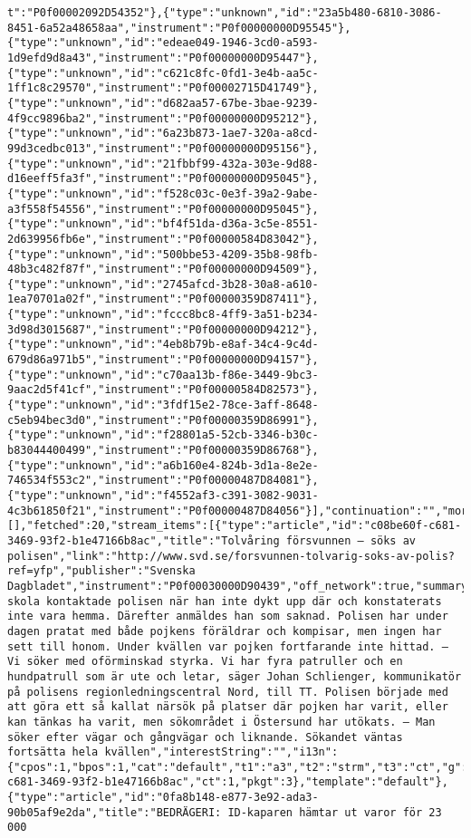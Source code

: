 \begin{verbatim}
t":"P0f00002092D54352"},{"type":"unknown","id":"23a5b480-6810-3086-8451-6a52a48658aa","instrument":"P0f00000000D95545"},{"type":"unknown","id":"edeae049-1946-3cd0-a593-1d9efd9d8a43","instrument":"P0f00000000D95447"},{"type":"unknown","id":"c621c8fc-0fd1-3e4b-aa5c-1ff1c8c29570","instrument":"P0f00002715D41749"},{"type":"unknown","id":"d682aa57-67be-3bae-9239-4f9cc9896ba2","instrument":"P0f00000000D95212"},{"type":"unknown","id":"6a23b873-1ae7-320a-a8cd-99d3cedbc013","instrument":"P0f00000000D95156"},{"type":"unknown","id":"21fbbf99-432a-303e-9d88-d16eeff5fa3f","instrument":"P0f00000000D95045"},{"type":"unknown","id":"f528c03c-0e3f-39a2-9abe-a3f558f54556","instrument":"P0f00000000D95045"},{"type":"unknown","id":"bf4f51da-d36a-3c5e-8551-2d639956fb6e","instrument":"P0f00000584D83042"},{"type":"unknown","id":"500bbe53-4209-35b8-98fb-48b3c482f87f","instrument":"P0f00000000D94509"},{"type":"unknown","id":"2745afcd-3b28-30a8-a610-1ea70701a02f","instrument":"P0f00000359D87411"},{"type":"unknown","id":"fccc8bc8-4ff9-3a51-b234-3d98d3015687","instrument":"P0f00000000D94212"},{"type":"unknown","id":"4eb8b79b-e8af-34c4-9c4d-679d86a971b5","instrument":"P0f00000000D94157"},{"type":"unknown","id":"c70aa13b-f86e-3449-9bc3-9aac2d5f41cf","instrument":"P0f00000584D82573"},{"type":"unknown","id":"3fdf15e2-78ce-3aff-8648-c5eb94bec3d0","instrument":"P0f00000359D86991"},{"type":"unknown","id":"f28801a5-52cb-3346-b30c-b83044400499","instrument":"P0f00000359D86768"},{"type":"unknown","id":"a6b160e4-824b-3d1a-8e2e-746534f553c2","instrument":"P0f00000487D84081"},{"type":"unknown","id":"f4552af3-c391-3082-9031-4c3b61850f21","instrument":"P0f00000487D84056"}],"continuation":"","more":150,"enrichment_ids":[],"fetched":20,"stream_items":[{"type":"article","id":"c08be60f-c681-3469-93f2-b1e47166b8ac","title":"Tolvåring försvunnen – söks av polisen","link":"http://www.svd.se/forsvunnen-tolvarig-soks-av-polis?ref=yfp","publisher":"Svenska Dagbladet","instrument":"P0f00030000D90439","off_network":true,"summary":"Pojkens skola kontaktade polisen när han inte dykt upp där och konstaterats inte vara hemma. Därefter anmäldes han som saknad. Polisen har under dagen pratat med både pojkens föräldrar och kompisar, men ingen har sett till honom. Under kvällen var pojken fortfarande inte hittad. – Vi söker med oförminskad styrka. Vi har fyra patruller och en hundpatrull som är ute och letar, säger Johan Schlienger, kommunikatör på polisens regionledningscentral Nord, till TT. Polisen började med att göra ett så kallat närsök på platser där pojken har varit, eller kan tänkas ha varit, men sökområdet i Östersund har utökats. – Man söker efter vägar och gångvägar och liknande. Sökandet väntas fortsätta hela kvällen","interestString":"","i13n":{"cpos":1,"bpos":1,"cat":"default","t1":"a3","t2":"strm","t3":"ct","g":"c08be60f-c681-3469-93f2-b1e47166b8ac","ct":1,"pkgt":3},"template":"default"},{"type":"article","id":"0fa8b148-e877-3e92-ada3-90b05af9e2da","title":"BEDRÄGERI: ID-kaparen hämtar ut varor för 23 000 
\end{verbatim}
